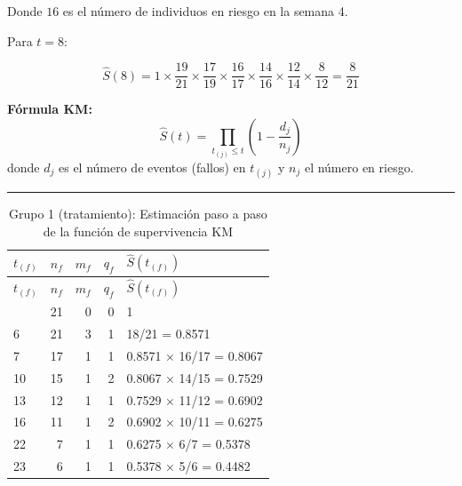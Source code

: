 \documentclass[
]{article}
\begin{document}
\begin{tcolorbox}
Donde \(16\) es el número de individuos en riesgo en la semana 4.

Para \(t = 8\):

\[
\hat{S}(8) = 1 \times \frac{19}{21} \times \frac{17}{19} \times \frac{16}{17} \times \frac{14}{16} \times \frac{12}{14} \times \frac{8}{12} = \frac{8}{21}
\]

\end{tcolorbox}

\textbf{Fórmula KM:}\\
\[
\hat{S}(t) = \prod_{t_{(j)} \le t} \left( 1 - \frac{d_j}{n_j} \right)
\] donde \(d_j\) es el número de eventos (fallos) en \(t_{(j)}\) y
\(n_j\) el número en riesgo.

\begin{center}\rule{0.5\linewidth}{0.5pt}\end{center}

\begin{longtable}[]{@{}lrrrl@{}}
\caption{Grupo 1 (tratamiento): Estimación paso a paso de la función de
supervivencia KM}\tabularnewline
\toprule\noalign{}
\(t_{(f)}\) & \(n_f\) & \(m_f\) & \(q_f\) & \(\hat{S}(t_{(f)})\) \\
\midrule\noalign{}
\endfirsthead
\toprule\noalign{}
\(t_{(f)}\) & \(n_f\) & \(m_f\) & \(q_f\) & \(\hat{S}(t_{(f)})\) \\
\midrule\noalign{}
\endhead
\bottomrule\noalign{}
\endlastfoot
0 & 21 & 0 & 0 & 1 \\
6 & 21 & 3 & 1 & 18/21 = 0.8571 \\
7 & 17 & 1 & 1 & 0.8571 × 16/17 = 0.8067 \\
10 & 15 & 1 & 2 & 0.8067 × 14/15 = 0.7529 \\
13 & 12 & 1 & 1 & 0.7529 × 11/12 = 0.6902 \\
16 & 11 & 1 & 2 & 0.6902 × 10/11 = 0.6275 \\
22 & 7 & 1 & 1 & 0.6275 × 6/7 = 0.5378 \\
23 & 6 & 1 & 1 & 0.5378 × 5/6 = 0.4482 \\
\end{longtable}
\end{document}
